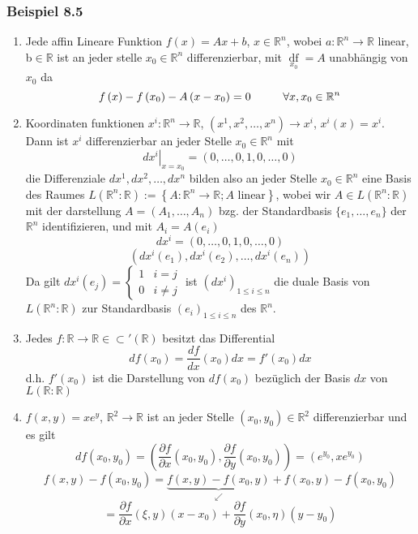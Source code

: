 \subsubsection*{Beispiel 8.5}
\begin{enumerate}[\indent a)]
\item Jede affin Lineare Funktion $f(x)=Ax+b$, $x\in\mathbb{R}^n$, wobei $a:\mathbb{R}^n\rightarrow\mathbb{R}$ linear, b$\in\mathbb{R}$ ist an jeder stelle $x_0\in\mathbb{R}^n$ differenzierbar, mit $\mathop {df}\limits_{{x_0}} =A$ unabhängig von $x_0$ da 
\[f\left( x \right) - f\left( {{x_0}} \right) - A\left( {x - {x_0}} \right) = 0\hspace{10mm}\forall x,{x_0} \in\mathbb{R}^n\]
\item Koordinaten funktionen $x^i:\mathbb{R}^n\rightarrow\mathbb{R}$, $\left( x^1,x^2,\dots,x^n\right)\rightarrow x^i$, $x^i(x)=x^i$. Dann ist $x^i$ differenzierbar an jeder Stelle $x_0\in\mathbb{R}^n$ mit $${\left. {d{x^i}} \right|_{x = {x_0}}} = \left( {0, \ldots ,0,1,0, \ldots ,0} \right)$$ die Differenziale $dx^1,dx^2,\dots,dx^n$ bilden also an jeder Stelle $x_0\in\mathbb{R}^n$ eine Basis des Raumes $L\left( {\mathbb{R}^n:\mathbb{R}} \right):=\left\{ A:\mathbb{R}^n\rightarrow\mathbb{R}; A\text{ linear}\right\}$, wobei wir $A\in L\left( \mathbb{R}^n:\mathbb{R}\right)$ mit der darstellung $A=\left( A_1,\dots,A_n\right)$ bzg. der Standardbasis $\{ e_1,\dots,e_n\}$ der $\mathbb{R}^n$ identifizieren, und mit $A_i=A\left( e_i\right)$ \[d{x^i} = \left( {0, \ldots ,0,1,0, \ldots ,0} \right)\]\[\left( {d{x^i}\left( {{e_1}} \right),d{x^i}\left( {{e_2}} \right), \ldots ,d{x^i}\left( {{e_n}} \right)} \right)\]
Da gilt $d{x^i}\left( {{e_j}} \right) = \left\{ {\begin{array}{*{20}{c}}
1&{i = j}\\
0&{i\not  = j}
\end{array}} \right.$ ist ${\left( {d{x^i}} \right)_{1 \le i \le n}}$ die duale Basis von $L\left( \mathbb{R}^n:\mathbb{R}\right)$ zur Standardbasis ${\left( {e_i} \right)_{1 \le i \le n}}$ des $\mathbb{R}^n$.
\item Jedes $f:\mathbb{R}\rightarrow\mathbb{R}\in\subset '\left(\mathbb{R}\right)$ besitzt das Differential \[df\left( {{x_0}} \right) = \frac{{df}}{{dx}}\left( {{x_0}} \right)dx = f'\left( {{x_0}} \right)dx\] d.h. $f'\left(x_0\right)$ ist die Darstellung von $df\left(x_0\right)$ bezüglich der Basis $dx$ von $L\left(\mathbb{R}:\mathbb{R}\right)$ 
\item $f\left(x,y\right)=xe^y$, $\mathbb{R}^2\rightarrow\mathbb{R}$ ist an jeder Stelle $\left(x_0,y_0\right)\in\mathbb{R}^2$ differenzierbar und es gilt \[df\left( {{x_0},{y_0}} \right) = \left( {\frac{{\partial f}}{{\partial x}}\left( {{x_0},{y_0}} \right),\frac{{\partial f}}{{\partial y}}\left( {{x_0},{y_0}} \right)} \right) = \left( {{e^{{y_0}}},x{e^{{y_0}}}} \right)\] \[f\left( {x,y} \right) - f\left( {{x_0},{y_0}} \right) = \underbrace {f\left( {x,y} \right) - f\left( {{x_0},y} \right)}_ \swarrow  + f\left( {{x_0},y} \right) - f\left( {{x_0},{y_0}} \right)\] \[ = \frac{{\partial f}}{{\partial x}}\left( {\xi ,y} \right)\left( {x - {x_0}} \right) + \frac{{\partial f}}{{\partial y}}\left( {{x_0},\eta } \right)\left( {y - {y_0}} \right)\]

\end{enumerate}
